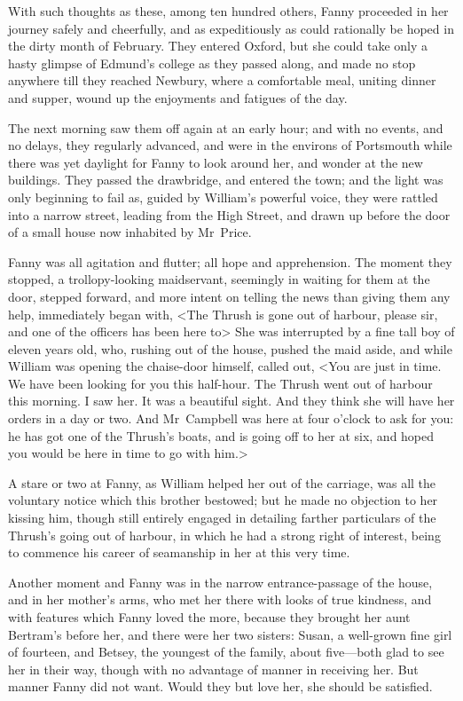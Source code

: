 With such thoughts as these, among ten hundred others, Fanny proceeded in her journey safely and cheerfully, and as expeditiously as could rationally be hoped in the dirty month of February. They entered Oxford, but she could take only a hasty glimpse of Edmund's college as they passed along, and made no stop anywhere till they reached Newbury, where a comfortable meal, uniting dinner and supper, wound up the enjoyments and fatigues of the day.

The next morning saw them off again at an early hour; and with no events, and no delays, they regularly advanced, and were in the environs of Portsmouth while there was yet daylight for Fanny to look around her, and wonder at the new buildings. They passed the drawbridge, and entered the town; and the light was only beginning to fail as, guided by William's powerful voice, they were rattled into a narrow street, leading from the High Street, and drawn up before the door of a small house now inhabited by Mr~Price.

Fanny was all agitation and flutter; all hope and apprehension. The moment they stopped, a trollopy-looking maidservant, seemingly in waiting for them at the door, stepped forward, and more intent on telling the news than giving them any help, immediately began with, <The Thrush is gone out of harbour, please sir, and one of the officers has been here to\longdash> She was interrupted by a fine tall boy of eleven years old, who, rushing out of the house, pushed the maid aside, and while William was opening the chaise-door himself, called out, <You are just in time. We have been looking for you this half-hour. The Thrush went out of harbour this morning. I saw her. It was a beautiful sight. And they think she will have her orders in a day or two. And Mr~Campbell was here at four o'clock to ask for you: he has got one of the Thrush's boats, and is going off to her at six, and hoped you would be here in time to go with him.>

A stare or two at Fanny, as William helped her out of the carriage, was all the voluntary notice which this brother bestowed; but he made no objection to her kissing him, though still entirely engaged in detailing farther particulars of the Thrush's going out of harbour, in which he had a strong right of interest, being to commence his career of seamanship in her at this very time.

Another moment and Fanny was in the narrow entrance-passage of the house, and in her mother's arms, who met her there with looks of true kindness, and with features which Fanny loved the more, because they brought her aunt Bertram's before her, and there were her two sisters: Susan, a well-grown fine girl of fourteen, and Betsey, the youngest of the family, about five—both glad to see her in their way, though with no advantage of manner in receiving her. But manner Fanny did not want. Would they but love her, she should be satisfied.

